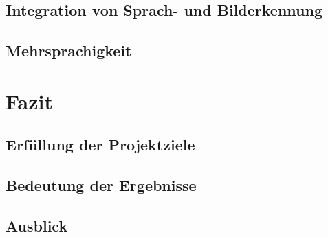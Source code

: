 \documentclass[a4paper,12pt]{article}
\begin{document}
\subsection{Integration von Sprach- und Bilderkennung}
\subsection{Mehrsprachigkeit}

\newpage

\section{Fazit}
\subsection{Erfüllung der Projektziele}
\subsection{Bedeutung der Ergebnisse}
\subsection{Ausblick}


\newpage
\nocite{*}
\printbibliography
\end{document}
